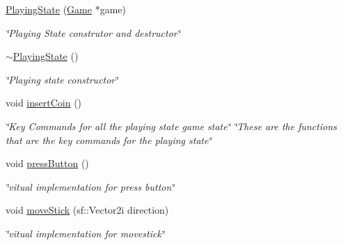 \begin{DoxyCompactItemize}
\item 
\hyperlink{classPlayingState_a0f58bcb8372adf9e533ce09451a24a1f}{Playing\+State} (\hyperlink{classGame}{Game} $\ast$game)
\begin{DoxyCompactList}\small\item\em \char`\"{}\+Playing State construtor and destructor\char`\"{} \end{DoxyCompactList}\item 
\hyperlink{classPlayingState_afd96eb2be532e40c9db2f9607e4ea284}{$\sim$\+Playing\+State} ()
\begin{DoxyCompactList}\small\item\em \char`\"{}\+Playing state constructor\char`\"{} \end{DoxyCompactList}\item 
\mbox{\label{classPlayingState_a936d41a2041ace2ccb67a9b779d113a7}} 
void \hyperlink{classPlayingState_a936d41a2041ace2ccb67a9b779d113a7}{insert\+Coin} ()
\begin{DoxyCompactList}\small\item\em \char`\"{}\+Key Commands for all the playing state game state\char`\"{}  \char`\"{}\+These are the functions that are the key commands for the playing state\char`\"{} \end{DoxyCompactList}\item 
\mbox{\label{classPlayingState_ae59ff244a6cd4a3c6f6fcaef41f4d8c5}} 
void \hyperlink{classPlayingState_ae59ff244a6cd4a3c6f6fcaef41f4d8c5}{press\+Button} ()
\begin{DoxyCompactList}\small\item\em \char`\"{}vitual implementation for press button\char`\"{} \end{DoxyCompactList}\item 
\mbox{\label{classPlayingState_a64cc25d3ffd45cf2a25fdf3bfdc2f28d}} 
void \hyperlink{classPlayingState_a64cc25d3ffd45cf2a25fdf3bfdc2f28d}{move\+Stick} (sf\+::\+Vector2i direction)
\begin{DoxyCompactList}\small\item\em \char`\"{}vitual implementation for movestick\char`\"{} \end{DoxyCompactList}\item 
\mbox{\label{classPlayingState_a5ca082ab48662e4a4836de1a2c15e6fd}} 

\end{DoxyCompactItemize}
